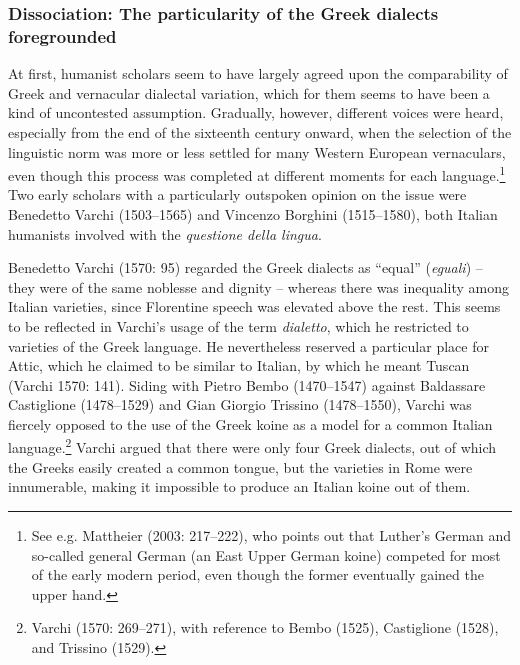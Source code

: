 \subsubsection{Dissociation: The particularity of the Greek dialects foregrounded}
\hypertarget{Toc19704861}{}\begin{styleStandard}
At first, humanist scholars seem to have largely agreed upon the comparability of Greek and vernacular dialectal variation, which for them seems to have been a kind of uncontested assumption. Gradually, however, different voices were heard, especially from the end of the sixteenth century onward, when the selection of the linguistic norm was more or less settled for many Western European vernaculars, even though this process was completed at different moments for each language.\footnote{ See e.g. Mattheier (2003: 217–222), who points out that Luther’s German and so-called general German (an East Upper German koine) competed for most of the early modern period, even though the former eventually gained the upper hand.} Two early scholars with a particularly outspoken opinion on the issue were Benedetto Varchi (1503–1565) and Vincenzo Borghini (1515–1580), both Italian humanists involved with the \textit{questione della lingua}.
\end{styleStandard}

\begin{styleStandard}
Benedetto Varchi (1570: 95) regarded the Greek dialects as “equal” (\textit{eguali}) – they were of the same noblesse and dignity – whereas there was inequality among Italian varieties, since Florentine speech was elevated above the rest. This seems to be reflected in Varchi’s usage of the term \textit{dialetto}, which he restricted to varieties of the Greek language. He nevertheless reserved a particular place for Attic, which he claimed to be similar to Italian, by which he meant Tuscan (Varchi 1570: 141). Siding with Pietro Bembo (1470–1547) against Baldassare Castiglione (1478–1529) and Gian Giorgio Trissino (1478–1550), Varchi was fiercely opposed to the use of the Greek koine as a model for a common Italian language.\footnote{ Varchi (1570: 269–271), with reference to Bembo (1525), Castiglione (1528), and Trissino (1529).} Varchi argued that there were only four Greek dialects, out of which the Greeks easily created a common tongue, but the varieties in Rome were innumerable, making it impossible to produce an Italian koine out of them.
\end{styleStandard}

